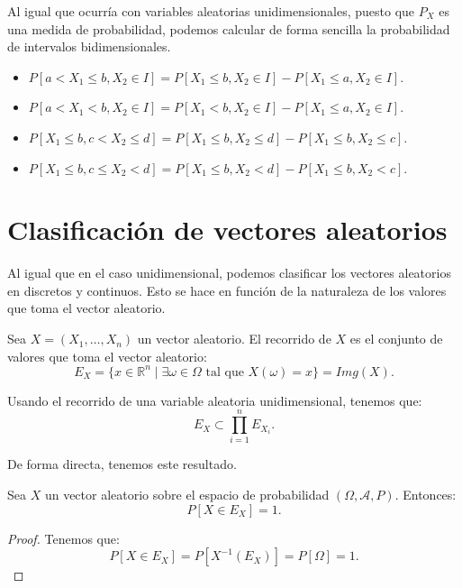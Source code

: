 Al igual que ocurría con variables aleatorias unidimensionales, puesto que $P_X$ es una medida de probabilidad, podemos calcular de forma sencilla la probabilidad de intervalos bidimensionales.
\begin{itemize}
    \item $P[a < X_1 \leq b, X_2 \in I] = P[X_1 \leq b, X_2 \in I] - P[X_1 \leq a, X_2 \in I]$.
    \item $P[a < X_1 < b, X_2 \in I] = P[X_1 < b, X_2 \in I] - P[X_1 \leq a, X_2 \in I]$.
    \item $P[X_1 \leq b, c < X_2 \leq d] = P[X_1 \leq b, X_2 \leq d] - P[X_1 \leq b, X_2 \leq c]$.
    \item $P[X_1 \leq b, c \leq X_2 < d] = P[X_1 \leq b, X_2 < d] - P[X_1 \leq b, X_2 < c]$.
\end{itemize}



\section{Clasificación de vectores aleatorios}

Al igual que en el caso unidimensional, podemos clasificar los vectores aleatorios en discretos y continuos. Esto se hace en función de la naturaleza de los valores que toma el vector aleatorio.
\begin{definicion}
    Sea $X=(X_1, \ldots, X_n)$ un vector aleatorio. El recorrido de $X$ es el conjunto de valores que toma el vector aleatorio:
    \begin{equation*}
        E_X = \{x\in \mathbb{R}^n \mid \exists \omega\in \Omega \text{ tal que } X(\omega) = x\}
        = Img(X).
    \end{equation*}
\end{definicion}

Usando el recorrido de una variable aleatoria unidimensional, tenemos que:
\begin{equation*}
    E_X \subset \prod_{i=1}^n E_{X_i}.
\end{equation*}

De forma directa, tenemos este resultado.
\begin{prop}
    Sea $X$ un vector aleatorio sobre el espacio de probabilidad $(\Omega, \mathcal{A}, P)$. Entonces:
    \begin{equation*}
        P[X\in E_X] = 1.
    \end{equation*}
\end{prop}
\begin{proof}
    Tenemos que:
    \begin{equation*}
        P[X\in E_X] = P[X^{-1}(E_X)] = P[\Omega] = 1.
    \end{equation*}
\end{proof}

